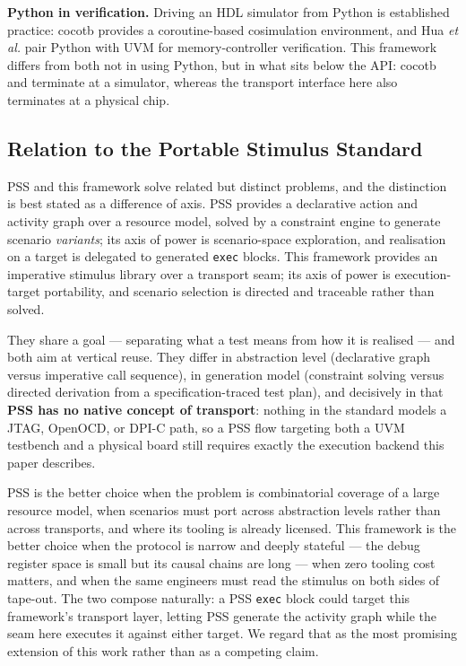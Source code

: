 \documentclass[conference]{IEEEtran}
\begin{document}
\textbf{Python in verification.} Driving an HDL simulator from Python is established practice: cocotb \cite{b4} provides a coroutine-based cosimulation environment, and Hua \textit{et al.} \cite{b5} pair Python with UVM for memory-controller verification. This framework differs from both not in using Python, but in what sits below the API: cocotb and \cite{b5} terminate at a simulator, whereas the transport interface here also terminates at a physical chip.

\subsection{Relation to the Portable Stimulus Standard}
PSS \cite{b3} and this framework solve related but distinct problems, and the distinction is best stated as a difference of axis. PSS provides a declarative action and activity graph over a resource model, solved by a constraint engine to generate scenario \textit{variants}; its axis of power is scenario-space exploration, and realisation on a target is delegated to generated \texttt{exec} blocks. This framework provides an imperative stimulus library over a transport seam; its axis of power is execution-target portability, and scenario selection is directed and traceable rather than solved.

They share a goal --- separating what a test means from how it is realised --- and both aim at vertical reuse. They differ in abstraction level (declarative graph versus imperative call sequence), in generation model (constraint solving versus directed derivation from a specification-traced test plan), and decisively in that \textbf{PSS has no native concept of transport}: nothing in the standard models a JTAG, OpenOCD, or DPI-C path, so a PSS flow targeting both a UVM testbench and a physical board still requires exactly the execution backend this paper describes.

PSS is the better choice when the problem is combinatorial coverage of a large resource model, when scenarios must port across abstraction levels rather than across transports, and where its tooling is already licensed. This framework is the better choice when the protocol is narrow and deeply stateful --- the debug register space is small but its causal chains are long --- when zero tooling cost matters, and when the same engineers must read the stimulus on both sides of tape-out. The two compose naturally: a PSS \texttt{exec} block could target this framework's transport layer, letting PSS generate the activity graph while the seam here executes it against either target. We regard that as the most promising extension of this work rather than as a competing claim.
\end{document}

